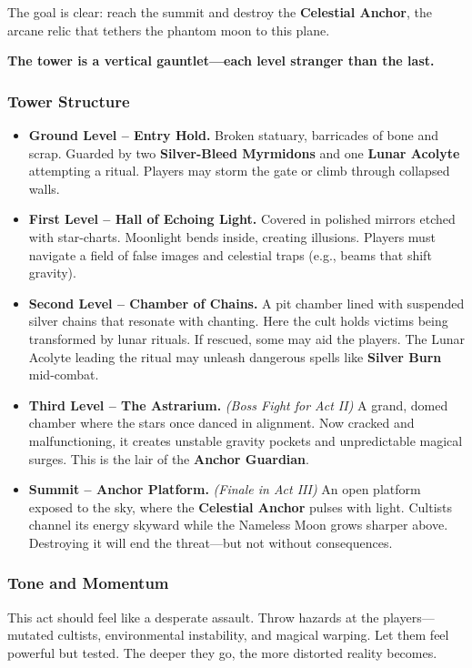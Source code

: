 The goal is clear: reach the summit and destroy the \textbf{Celestial Anchor}, the arcane relic that tethers the phantom moon to this plane.

\textbf{The tower is a vertical gauntlet—each level stranger than the last.}

\subsubsection{Tower Structure}

\begin{itemize}
  \item \textbf{Ground Level – Entry Hold.}  
  Broken statuary, barricades of bone and scrap. Guarded by two \textbf{Silver-Bleed Myrmidons} and one \textbf{Lunar Acolyte} attempting a ritual. Players may storm the gate or climb through collapsed walls.

  \item \textbf{First Level – Hall of Echoing Light.}  
  Covered in polished mirrors etched with star-charts. Moonlight bends inside, creating illusions. Players must navigate a field of false images and celestial traps (e.g., beams that shift gravity).

  \item \textbf{Second Level – Chamber of Chains.}  
  A pit chamber lined with suspended silver chains that resonate with chanting. Here the cult holds victims being transformed by lunar rituals. If rescued, some may aid the players. The Lunar Acolyte leading the ritual may unleash dangerous spells like \textbf{Silver Burn} mid-combat.

  \item \textbf{Third Level – The Astrarium.}  \emph{(Boss Fight for Act II)}
  A grand, domed chamber where the stars once danced in alignment. Now cracked and malfunctioning, it creates unstable gravity pockets and unpredictable magical surges. This is the lair of the \textbf{Anchor Guardian}.

  \item \textbf{Summit – Anchor Platform.}  \emph{(Finale in Act III)}
  An open platform exposed to the sky, where the \textbf{Celestial Anchor} pulses with light. Cultists channel its energy skyward while the Nameless Moon grows sharper above. Destroying it will end the threat—but not without consequences.
\end{itemize}

\subsubsection{Tone and Momentum}
This act should feel like a desperate assault. Throw hazards at the players—mutated cultists, environmental instability, and magical warping. Let them feel powerful but tested. The deeper they go, the more distorted reality becomes.

